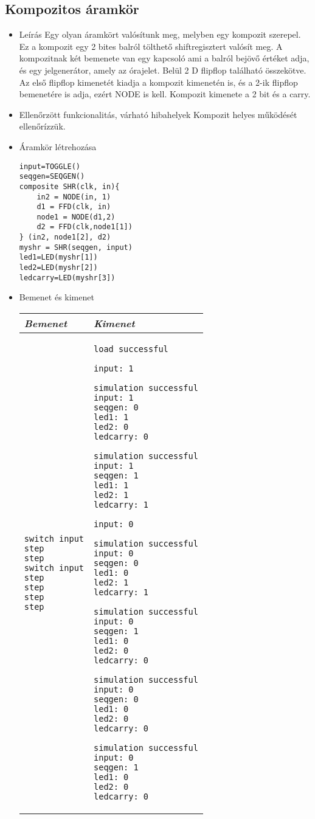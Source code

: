 \subsection{Kompozitos áramkör}
\begin{itemize}
\item Leírás\newline
Egy olyan áramkört valósítunk meg, melyben egy kompozit szerepel. Ez a kompozit egy 2 bites balról tölthető shiftregisztert valósít meg. A kompozitnak két bemenete van egy kapcsoló ami a balról bejövő értéket adja, és egy jelgenerátor, amely az órajelet. Belül 2 D flipflop található összekötve. Az első flipflop kimenetét kiadja a kompozit kimenetén is, és a 2-ik flipflop bemenetére is adja, ezért NODE is kell. Kompozit kimenete a 2 bit és a carry.
\item Ellenőrzött funkcionalitás, várható hibahelyek\newline
Kompozit helyes működését ellenőrízzük.

\item Áramkör létrehozása

\begin{verbatim}
input=TOGGLE()
seqgen=SEQGEN()
composite SHR(clk, in){
    in2 = NODE(in, 1)
    d1 = FFD(clk, in)
    node1 = NODE(d1,2)
    d2 = FFD(clk,node1[1])
} (in2, node1[2], d2)
myshr = SHR(seqgen, input)
led1=LED(myshr[1])
led2=LED(myshr[2])
ledcarry=LED(myshr[3])
\end{verbatim}

\item Bemenet és kimenet\newline

\begin{tabular}{|p{7cm}|p{7cm}|} 
\hline 
\textit{Bemenet} & \textit{Kimenet} \\ \hline
\begin{verbatim}
switch input
step
step
switch input
step
step
step
step
\end{verbatim}
& 
\begin{verbatim}
load successful

input: 1

simulation successful
input: 1
seqgen: 0
led1: 1
led2: 0
ledcarry: 0

simulation successful
input: 1
seqgen: 1
led1: 1
led2: 1
ledcarry: 1

input: 0

simulation successful
input: 0
seqgen: 0
led1: 0
led2: 1
ledcarry: 1

simulation successful
input: 0
seqgen: 1
led1: 0
led2: 0
ledcarry: 0

simulation successful
input: 0
seqgen: 0
led1: 0
led2: 0
ledcarry: 0

simulation successful
input: 0
seqgen: 1
led1: 0
led2: 0
ledcarry: 0
\end{verbatim}
\\ \hline
\end{tabular}

\end{itemize}


